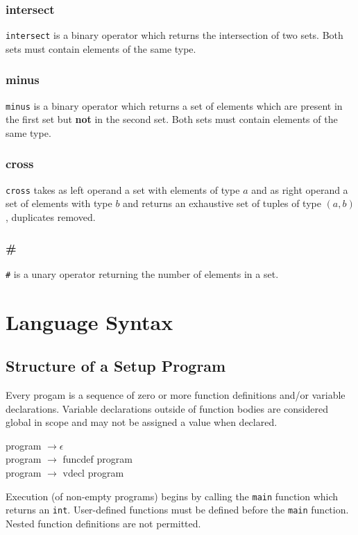 \subsubsection*{intersect}
\verb|intersect| is a binary operator which returns the intersection of two sets.  Both sets must contain elements of the same type.
\subsubsection*{minus}
\verb|minus| is a binary operator which returns a set of elements which are present in the first set but \textbf{not} in the second set.  Both sets must contain elements of the same type.

\subsubsection*{cross}
\verb|cross| takes as left operand a set with elements of type $a$ and as right operand a set of elements with type $b$ and returns an exhaustive set of tuples of type $(a,b)$, duplicates removed.

\subsubsection*{\#}
\verb|#| is a unary operator returning the number of elements in a set.  

\section{Language Syntax}
\subsection{Structure of a Setup Program}
Every \lang progam is a sequence of zero or more function definitions and/or variable declarations.  Variable declarations outside of function bodies are considered global in scope and may not be assigned a value when declared.
\begin{grammar}
program $\to \epsilon$\\
program $\to$ funcdef program\\
program $\to$ vdecl program
\end{grammar}
Execution (of non-empty programs) begins by calling the \verb|main| function which returns an \verb|int|.  User-defined functions must be defined before the \verb|main| function.  Nested function definitions are not permitted.

